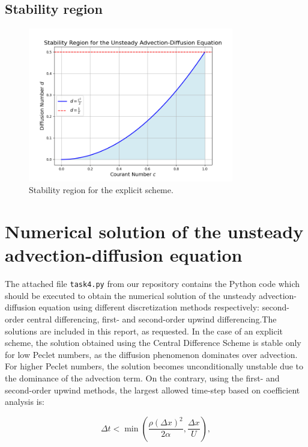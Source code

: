 \documentclass{article}
\begin{document}
\subsection{Stability region}
\begin{figure}[h]
  \centering
  \includegraphics[width=0.8\textwidth]{stability_region_plot.png}
  \caption{Stability region for the explicit scheme.}
  \label{fig:stability_region}
\end{figure}


\section{Numerical solution of the unsteady advection-diffusion equation}

The attached file \texttt{task4.py} from our repository \cite{GitHubRepo} contains the Python code which should be executed to obtain 
the numerical solution of the unsteady advection-diffusion equation using different discretization methods respectively: second-order central 
differencing, first- and second-order upwind differencing.The solutions are included in this report, as requested. In the case of an explicit 
scheme, the solution obtained using the Central Difference Scheme is stable only for low Peclet numbers, as the diffusion phenomenon dominates 
over advection. For higher Peclet numbers, the solution becomes unconditionally unstable due to the dominance of the advection term.
On the contrary, using the first- and second-order upwind methods, the largest allowed time-step based on coefficient analysis is:

\[
\Delta t < \min \left( \frac{\rho (\Delta x)^2}{2 \alpha}, \frac{\Delta x}{U} \right),
\]
\end{document}
